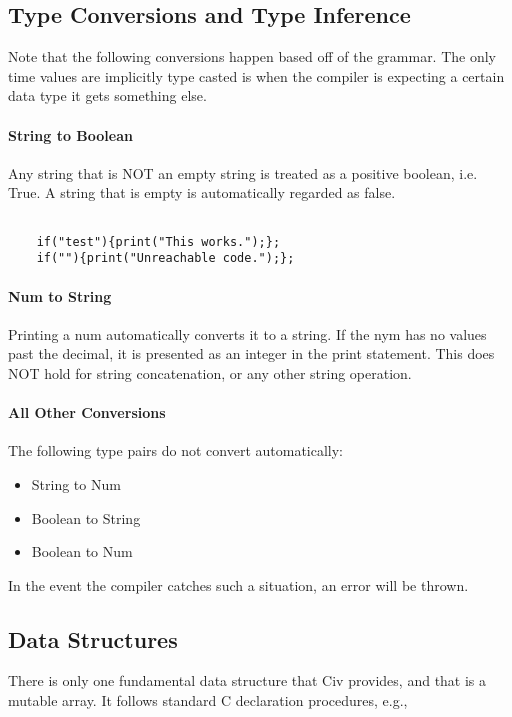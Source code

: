 \documentclass[a4paper]{article}
\begin{document}
\subsection{Type Conversions and Type Inference}
Note that the following conversions happen based off of the grammar. The only time values are implicitly type casted is when the compiler is expecting a certain data type it gets something else.

\paragraph{String to Boolean}
Any string that is NOT an empty string is treated as a positive boolean, i.e. True. A string that is empty is automatically regarded as false.

{\selectfont
\begin{lstlisting}

	if("test"){print("This works.");};
	if(""){print("Unreachable code.");};
\end{lstlisting}
}

\paragraph{Num to String}
Printing a num automatically converts it to a string. If the nym has no values past the decimal, it is presented as an integer in the print statement. This does NOT hold for string concatenation, or any other string operation.

\paragraph{All Other Conversions}
The following type pairs do not convert automatically:
\begin{itemize}
\item{String to Num}
\item{Boolean to String}
\item{Boolean to Num}
\end{itemize}
In the event the compiler catches such a situation, an error will be thrown.

\subsection{Data Structures}
There is only one fundamental data structure that Civ provides, and that is a mutable array. It follows standard C declaration procedures, e.g.,
\end{document}
